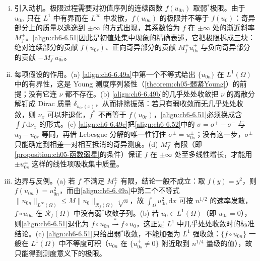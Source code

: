 \documentclass[../../main.tex]{subfiles}%
\begin{document}
\begin{remark}\label{remark:ch06-6.5.2动机}
\begin{enumerate}[(i)]
\item 引入动机。极限过程需要对初值序列的连续函数 $f(u_{0n})$ 取弱$^*$极限。由于 $u_{0n}$ 只在 $L^1$ 中有界而在 $L^\infty$ 中发散，$f(u_{0n})$ 的极限并不等于 $f(u_0)$：奇异部分上的质量以逃逸到 $\pm\infty$ 的方式出现，其系数恰为 $f$ 在 $\pm\infty$ 处的渐近斜率 $M^\pm_f$。\eqref{align:ch6-6.51}因此是初值处集中现象的精确表述，它把极限拆成三块：绝对连续部分的贡献 $f(u_{0r})$、正向奇异部分的贡献 $M^+_fu^+_{0s}$ 与负向奇异部分的贡献 $-M^-_fu^-_{0s}$。
\item 每项假设的作用。(a) \eqref{align:ch6-6.49a}中第一个不等式给出 $\{u_{0n}\}$ 在 $L^1(\Omega)$ 中的有界性，这是 Young 测度序列紧性（\cref{theorem:ch05-弱紧Young}）的前提；没有它连 $\nu$ 都不存在。(b) \eqref{align:ch6-6.49b}的几乎处处收敛把 $\nu$ 的离散分解钉成 Dirac 质量 $\delta_{u_{0r}(x)}$，从而排除振荡：若只有弱收敛而无几乎处处收敛，则 $\nu_x$ 可以非退化，$f^*$ 不再等于 $f(u_{0r})$，\eqref{align:ch6-6.51}必须换成含 $\int f\,\mathrm{d}\nu_x$ 的形式。(c) \eqref{align:ch6-6.49c}把\eqref{align:ch6-6.52}中的 $\sigma=\sigma^+-\sigma^-$ 与 $u_0-u_{0r}$ 等同，再借 Lebesgue 分解的唯一性钉住 $\sigma^\pm=u^\pm_{0s}$；没有这一步，$\sigma^\pm$ 只能确定到相差一对相互抵消的奇异测度。(d) $M^\pm_f$ 有限（即\cref{proposition:ch05-函数弱星}的条件）保证 $f$ 在 $\pm\infty$ 处至多线性增长，才能用 $\pm u^\pm_{0s}$ 这样的线性项吸收集中质量。
\item 边界与反例。(a) 若 $f$ 不满足 $M^\pm_f$ 有限，结论一般不成立：取 $f(y)=y^2$，则 $f(u_{0n})=u_{0n}^2$，而由\eqref{align:ch6-6.49a}中第二个不等式 $\|u_{0n}\|_{L^\infty(\Omega)}\leqslant M\|u_0\|_{\mathscr{R}_f(\Omega)}\sqrt[4]{n}$，故 $\int_\Omega u_{0n}^2\,\mathrm{d}x$ 可按 $n^{1/2}$ 的速率发散，$f\circ u_{0n}$ 在 $\mathscr{R}_f(\Omega)$ 中没有弱$^*$收敛子列。(b) 若 $u_0\in L^1(\Omega)$（即 $u_{0s}=0$），则\eqref{align:ch6-6.51}退化为 $f\circ u_{0n}\stackrel{*}{\rightharpoonup}f\circ u_0$，这正是 $L^1$ 中几乎处处收敛时的标准结论。(c) \eqref{align:ch6-6.51}只给出弱$^*$收敛，不能加强为 $L^1$ 强收敛：$\{f\circ u_{0n}\}$ 一般在 $L^1(\Omega)$ 中不等度可积（$u_{0n}$ 在 $\{u^+_{0s}\neq0\}$ 附近取到 $n^{1/4}$ 量级的值），故只能得到测度意义下的极限。
\end{enumerate}
\end{remark}
\end{document}
